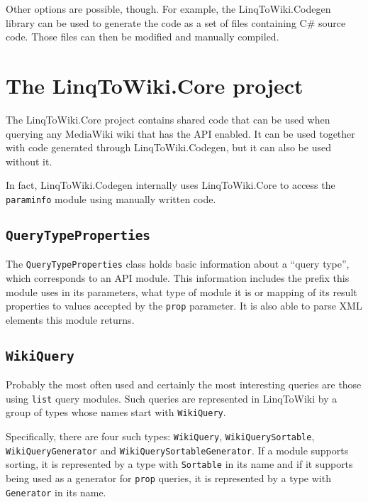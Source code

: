 Other options are possible, though.
For example, the LinqToWiki.Codegen library can be used to generate the code as a set of files containing C\# source code.
Those files can then be modified and manually compiled.

\section{The LinqToWiki.Core project}

The LinqToWiki.Core project contains shared code that can be used when querying any MediaWiki wiki
that has the API enabled.
It can be used together with code generated through LinqToWiki\allowbreak{}.Codegen,
but it can also be used without it.

In fact, LinqToWiki.\allowbreak{}Codegen internally uses LinqToWiki.Core to access the \texttt{paraminfo} module
using manually written code.

\subsection{\texorpdfstring{\lstinline{QueryTypeProperties}}{QueryTypeProperties}}

The \lstinline{QueryTypeProperties} class holds basic information about a “query type”,
which corresponds to an API module.
This information includes the prefix this module uses in its parameters,
what type of module it is or mapping of its result properties to values accepted by the \texttt{prop} parameter.
It is also able to parse XML elements this module returns.

\subsection{\texorpdfstring{\lstinline{WikiQuery}}{WikiQuery}}

Probably the most often used and certainly the most interesting queries are those using \texttt{list} query modules.
Such queries are represented in LinqToWiki by a group of types whose names start with \lstinline{WikiQuery}.

Specifically, there are four such types:
\lstinline{WikiQuery}, \lstinline{WikiQuerySortable}, \lstinline{Wiki}\lstBreak\lstinline{Query}\lstBreak\lstinline{Generator} and \lstinline{WikiQuerySortableGenerator}.
If a module supports sorting, it is represented by a type with \lstinline{Sortable} in its name
and if it supports being used as a generator for \texttt{prop} queries, it is represented by a type with \lstinline{Generator} in its name.

